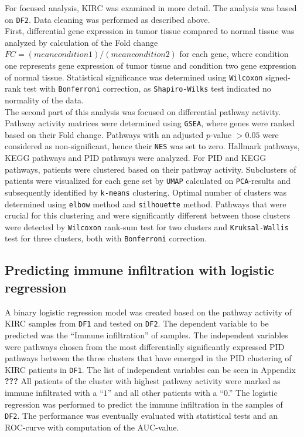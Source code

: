 \documentclass[
  parskip,
  oneside]{\documentclass[oneside]{book}}
\begin{document}
For focused analysis, KIRC was examined in more detail. The analysis was
based on \texttt{DF2}. Data cleaning was performed as described above.\\
First, differential gene expression in tumor tissue compared to normal
tissue was analyzed by calculation of the Fold change
\(FC =(mean condition 1) / (mean condition 2)\) for each gene, where
condition one represents gene expression of tumor tissue and condition
two gene expression of normal tissue. Statistical significance was
determined using \texttt{Wilcoxon} signed-rank test with
\texttt{Bonferroni} correction, as \texttt{Shapiro-Wilks} test indicated
no normality of the data.\\
The second part of this analysis was focused on differential pathway
activity. Pathway activity matrices were determined using \texttt{GSEA},
where genes were ranked based on their Fold change. Pathways with an
adjusted \(p\)-value \(>0.05\) were considered as non-significant, hence
their \texttt{NES} was set to zero. Hallmark pathways, KEGG pathways and
PID pathways were analyzed. For PID and KEGG pathways, patients were
clustered based on their pathway activity. Subclusters of patients were
visualized for each gene set by \texttt{UMAP} calculated on
\texttt{PCA}-results and subsequently identified by \texttt{k-means}
clustering. Optimal number of clusters was determined using
\texttt{elbow} method and \texttt{silhouette} method. Pathways that were
crucial for this clustering and were significantly different between
those clusters were detected by \texttt{Wilcoxon} rank-sum test for two
clusters and \texttt{Kruksal-Wallis} test for three clusters, both with
\texttt{Bonferroni} correction.

\hypertarget{predicting-immune-infiltration-with-logistic-regression}{%
\subsection{Predicting immune infiltration with logistic
regression}\label{predicting-immune-infiltration-with-logistic-regression}}

A binary logistic regression model was created based on the pathway
activity of KIRC samples from \texttt{DF1} and tested on \texttt{DF2}.
The dependent variable to be predicted was the ``Immune infiltration''
of samples. The independent variables were pathways chosen from the most
differentially significantly expressed PID pathways between the three
clusters that have emerged in the PID clustering of KIRC patients in
\texttt{DF1}. The list of independent variables can be seen in Appendix
\textbf{???} All patients of the cluster with highest pathway activity
were marked as immune infiltrated with a ``\(1\)'' and all other
patients with a ``\(0\).'' The logistic regression was performed to
predict the immune infiltration in the samples of \texttt{DF2}. The
performance was eventually evaluated with statistical tests and an
ROC-curve with computation of the AUC-value.
\end{document}
